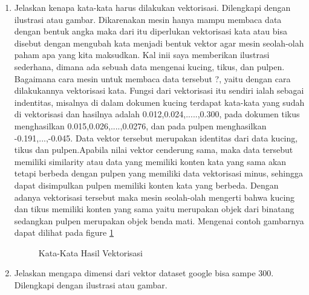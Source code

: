 \begin{enumerate}

\item Jelaskan kenapa kata-kata harus dilakukan vektorisasi. Dilengkapi dengan ilustrasi atau gambar.
	\subitem Dikarenakan mesin hanya mampu membaca data dengan bentuk angka maka dari itu diperlukan vektorisasi kata atau bisa disebut dengan mengubah kata menjadi bentuk vektor agar mesin seolah-olah paham apa yang kita maksudkan. Kal inii saya memberikan ilustrasi sederhana, dimana ada sebuah data mengenai kucing, tikus, dan pulpen. Bagaimana cara mesin untuk membaca data tersebut ?, yaitu dengan cara dilakukannya vektorisasi kata. Fungsi dari vektorisasi itu sendiri ialah sebagai indentitas, misalnya di dalam dokumen kucing terdapat kata-kata yang sudah di vektorisasi dan hasilnya adalah 0.012,0.024,.....,0.300, pada dokumen tikus menghasilkan 0.015,0.026,....,0.0276, dan pada pulpen menghasilkan -0.191,...,-0.045. Data vektor tersebut merupakan identitas dari data kucing, tikus dan pulpen.Apabila nilai vektor cenderung sama, maka data tersebut memiliki similarity atau data yang memiliki konten kata yang sama akan tetapi berbeda dengan pulpen yang memiliki data vektorisasi minus, sehingga dapat disimpulkan pulpen memiliki konten kata yang berbeda. Dengan adanya vektorisasi tersebut maka mesin seolah-olah mengerti bahwa kucing dan tikus memiliki konten yang sama yaitu merupakan objek dari binatang sedangkan pulpen merupakan objek benda mati. Mengenai contoh gambarnya dapat dilihat pada figure \ref{YNC5-1}

	\begin{figure}[ht]
		\caption{Kata-Kata Hasil Vektorisasi}
		\label{YNC5-1}
	\end{figure}

\item Jelaskan mengapa dimensi dari vektor dataset google bisa sampe 300. Dilengkapi dengan ilustrasi atau gambar.


\end{enumerate}
